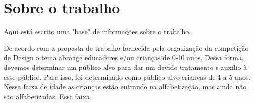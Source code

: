 \documentclass{sigchi}
\begin{document}
\title{\plaintitle}

\author{%
  \\
  \\
  \\  
  \\
  \\  
}

\maketitle

\section{Sobre o trabalho}

Aqui está escrito uma "base" de informações sobre o trabalho.

De acordo com a proposta de trabalho fornecida pela organização da competição de Design o tema abrange educadores e/ou crianças de 0-10 anos. Dessa forma, devemos determinar um público alvo para dar um devido tratamento e auxílio à esse público. Para isso, foi determinado como público alvo crianças de 4 a 5 anos. Nessa faixa de idade as crianças estão entrando na alfabetização, mas ainda não são alfabetizadas. Essa faixa   
\end{document}
